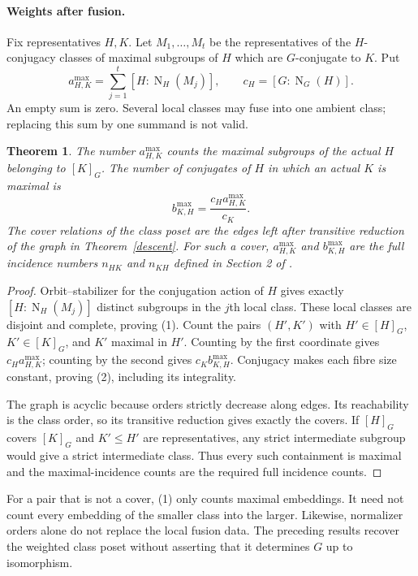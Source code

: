 \documentclass[11pt]{article}
\newtheorem{theorem}{Theorem}\newtheorem{lemma}[theorem]{Lemma}
\newcommand{\N}{\operatorname{N}}\newcommand{\Inn}{\operatorname{Inn}}
\begin{document}
\paragraph{Weights after fusion.}
Fix representatives $H,K$. Let $M_1,\ldots,M_t$ be the representatives
of the $H$-conjugacy classes of maximal subgroups of $H$ which are
$G$-conjugate to $K$. Put
\[
 a^{\max}_{H,K}=\sum_{j=1}^t[H:\N_H(M_j)],\qquad
 c_H=[G:\N_G(H)].                                      \tag{1}
\]
An empty sum is zero. Several local classes may fuse into one ambient
class; replacing this sum by one summand is not valid.

\begin{theorem}\label{weights}
The number $a^{\max}_{H,K}$ counts the maximal subgroups of the actual
$H$ belonging to $[K]_G$. The number of conjugates of $H$ in which an
actual $K$ is maximal is
\[
 b^{\max}_{K,H}=\frac{c_Ha^{\max}_{H,K}}{c_K}.
                                                               \tag{2}
\]
The cover relations of the class poset are the edges left after transitive
reduction of the graph in Theorem~\ref{descent}. For such a cover,
$a^{\max}_{H,K}$ and $b^{\max}_{K,H}$ are the full incidence numbers
$n_{HK}$ and $n_{KH}$ defined in Section 2 of \cite{CL}.
\end{theorem}
\begin{proof}
Orbit--stabilizer for the conjugation action of $H$ gives exactly
$[H:\N_H(M_j)]$ distinct subgroups in the $j$th local class. These local
classes are disjoint and complete, proving (1). Count the pairs
$(H',K')$ with $H'\in[H]_G$, $K'\in[K]_G$, and $K'$ maximal in $H'$.
Counting by the first coordinate gives $c_Ha^{\max}_{H,K}$; counting by
the second gives $c_Kb^{\max}_{K,H}$. Conjugacy makes each fibre size
constant, proving (2), including its integrality.

The graph is acyclic because orders strictly decrease along edges. Its
reachability is the class order, so its transitive reduction gives exactly
the covers. If $[H]_G$ covers $[K]_G$ and $K'\leq H'$ are representatives,
any strict intermediate subgroup would give a strict intermediate class.
Thus every such containment is maximal and the maximal-incidence counts
are the required full incidence counts.
\end{proof}

For a pair that is not a cover, (1) only counts maximal embeddings.
It need not count every embedding of the smaller class into the larger.
Likewise, normalizer orders alone do not replace the local fusion data.
The preceding results recover the weighted class poset without asserting
that it determines $G$ up to isomorphism.
\end{document}
